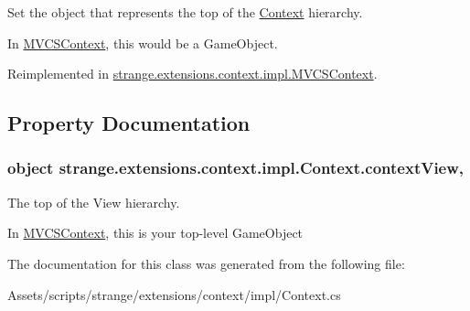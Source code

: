 Set the object that represents the top of the \hyperlink{classstrange_1_1extensions_1_1context_1_1impl_1_1_context}{Context} hierarchy. 

In \hyperlink{classstrange_1_1extensions_1_1context_1_1impl_1_1_m_v_c_s_context}{M\-V\-C\-S\-Context}, this would be a Game\-Object. 

Reimplemented in \hyperlink{classstrange_1_1extensions_1_1context_1_1impl_1_1_m_v_c_s_context_aecc258bb5f3d3edd1a3f93ca33a2ce4e}{strange.\-extensions.\-context.\-impl.\-M\-V\-C\-S\-Context}.



\subsection{Property Documentation}
\hypertarget{classstrange_1_1extensions_1_1context_1_1impl_1_1_context_a6403b0233cce89fdf38d810c740795c2}{
\subsubsection[{context\-View}]{\setlength{\rightskip}{0pt plus 5cm}object strange.\-extensions.\-context.\-impl.\-Context.\-context\-View\hspace{0.3cm}{\ttfamily [get]}, {\ttfamily [set]}}}\label{classstrange_1_1extensions_1_1context_1_1impl_1_1_context_a6403b0233cce89fdf38d810c740795c2}


The top of the View hierarchy. 

In \hyperlink{classstrange_1_1extensions_1_1context_1_1impl_1_1_m_v_c_s_context}{M\-V\-C\-S\-Context}, this is your top-\/level Game\-Object 

The documentation for this class was generated from the following file\-:\begin{DoxyCompactItemize}
\item 
Assets/scripts/strange/extensions/context/impl/Context.\-cs\end{DoxyCompactItemize}
